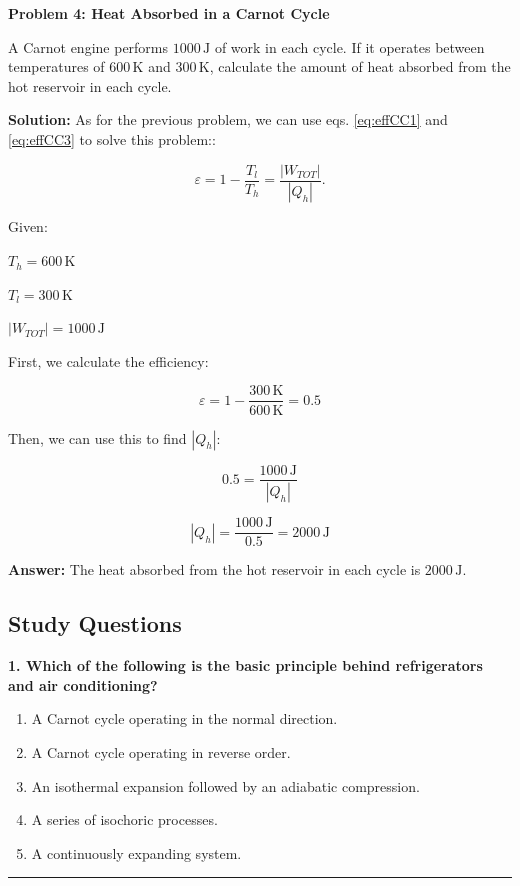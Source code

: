 \documentclass[
  9pt,
]{extbook}
\providecommand{\tightlist}{%
  \setlength{\itemsep}{0pt}\setlength{\parskip}{0pt}}
\theoremstyle{definition}
\theoremstyle{definition}
\theoremstyle{definition}
\theoremstyle{definition}
\theoremstyle{remark}
\begin{document}
\textbf{Problem 4: Heat Absorbed in a Carnot Cycle}

A Carnot engine performs \(1000\,\text{J}\) of work in each cycle. If it operates between temperatures of \(600\,\text{K}\) and \(300\,\text{K}\), calculate the amount of heat absorbed from the hot reservoir in each cycle.

\textbf{Solution:} As for the previous problem, we can use eqs. \eqref{eq:effCC1} and \eqref{eq:effCC3} to solve this problem::

\[\varepsilon = 1 - \frac{T_l}{T_h} = \frac{|W_{TOT}|}{|Q_h|}.\]

Given:

\(T_h = 600\,\text{K}\)

\(T_l = 300\,\text{K}\)

\(|W_{TOT}| = 1000\,\text{J}\)

First, we calculate the efficiency:

\[\varepsilon = 1 - \frac{300\,\text{K}}{600\,\text{K}} = 0.5\]

Then, we can use this to find \(|Q_h|\):

\[0.5 = \frac{1000\,\text{J}}{|Q_h|}\]

\[|Q_h| = \frac{1000\,\text{J}}{0.5} = 2000\,\text{J}\]

\textbf{Answer:} The heat absorbed from the hot reservoir in each cycle is \(2000 \,\text{J}\).

\subsection{Study Questions}\label{quest5}

\textbf{1. Which of the following is the basic principle behind refrigerators and air conditioning?}

\begin{enumerate}
\def\labelenumi{\alph{enumi}.}
\tightlist
\item
  A Carnot cycle operating in the normal direction.
\item
  A Carnot cycle operating in reverse order.
\item
  An isothermal expansion followed by an adiabatic compression.
\item
  A series of isochoric processes.
\item
  A continuously expanding system.
\end{enumerate}

\begin{center}\rule{0.5\linewidth}{0.5pt}\end{center}
\end{document}
